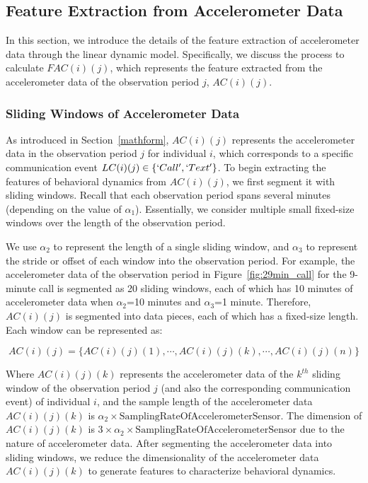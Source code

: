 \subsection{Feature Extraction from Accelerometer Data}
\label{feature for acc}

In this section, we introduce the details of the feature extraction of accelerometer data through the linear dynamic model. Specifically, we discuss the process to calculate $FAC(i)(j)$, which represents the feature extracted from the accelerometer data of the observation period $j$, $AC(i)(j)$.

\subsubsection{Sliding Windows of Accelerometer Data}
As introduced in Section~\ref{mathform}, $AC(i)(j)$ represents the accelerometer data in the observation period $j$ for individual $i$, which corresponds to a specific communication event $LC(i)(j)\in \{`Call', `Text'\}$. To begin extracting the features of behavioral dynamics from $AC(i)(j)$, we first segment it with sliding windows.  Recall that each observation period spans several minutes (depending on the value of $\alpha_{1}$).  Essentially, we consider multiple small fixed-size windows over the length of the observation period. 

We use $\alpha_{2}$ to represent the length of a single sliding window, and $\alpha_{3}$ to represent the stride or offset of each window into the observation period.
For example, the accelerometer data of the observation period in Figure~\ref{fig:29min_call} for the 9-minute call is segmented as 20 sliding windows, each of which has 10 minutes of accelerometer data when $\alpha_{2}$=10 minutes and $\alpha_{3}$=1 minute. Therefore, $AC(i)(j)$ is segmented into data pieces, each of which has a fixed-size length.  Each window can be represented as:

\begin{equation}
\label{AC series}
AC(i)(j)=\{AC(i)(j)(1),\cdots, AC(i)(j)(k), \cdots, AC(i)(j)(n)\}
\end{equation}

Where $AC(i)(j)(k)$ represents the accelerometer data of the $k^{th}$ sliding window of the observation period $j$ (and also the corresponding communication event) of individual $i$, and the sample length of the accelerometer data $AC(i)(j)(k)$ is $\alpha_{2} \times \mathrm{SamplingRateOfAccelerometerSensor}$. The dimension of $AC(i)(j)(k)$ is $3 \times \alpha_{2} \times \mathrm{SamplingRateOfAccelerometerSensor}$ due to the nature of accelerometer data. After segmenting the accelerometer data into sliding windows, we reduce the dimensionality of the accelerometer data $AC(i)(j)(k)$ to generate features to characterize behavioral dynamics.%

